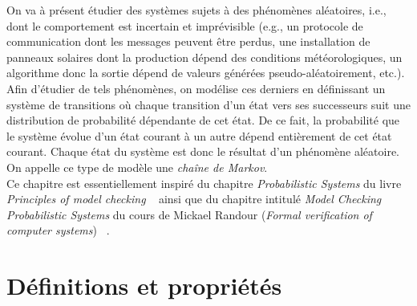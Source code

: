 \documentclass[12pt,a4paper]{report}
\theoremstyle{definition}%
\theoremstyle{remark}
\begin{document}
On va à présent étudier des systèmes sujets à des phénomènes aléatoires, i.e.,
dont le comportement est incertain et imprévisible (e.g., un protocole de
communication dont les messages peuvent être perdus, une installation de panneaux
solaires dont la production dépend des conditions météorologiques, un algorithme
donc la
sortie dépend de valeurs générées pseudo-aléatoirement, etc.).
Afin d'étudier de tels phénomènes, on modélise ces derniers en définissant un système de transitions où chaque transition d'un état vers ses successeurs suit une distribution de probabilité dépendante de cet état. De ce fait,
la probabilité que le système évolue d'un état courant à un autre dépend
entièrement de cet état courant. Chaque état du système est donc le résultat d'un
phénomène aléatoire. On appelle ce type de modèle une \textit{chaîne de Markov}.\\

Ce chapitre est essentiellement inspiré du chapitre \textit{Probabilistic Systems} du livre \textit{Principles of model checking} ~\cite{DBLP:books/daglib/0020348} ainsi que du chapitre intitulé \textit{Model Checking Probabilistic Systems} du cours de Mickael Randour (\textit{Formal verification of computer systems}) ~\cite{Course1}.

\section{Définitions et propriétés}
\end{document}
